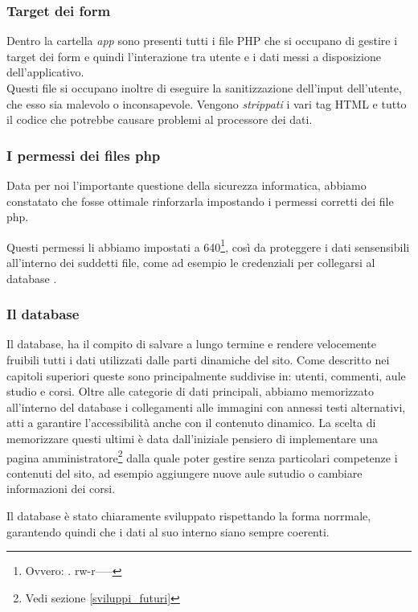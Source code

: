 \subsubsection{Target dei form}
Dentro la cartella \textit{app} sono presenti tutti i file PHP che si occupano di gestire i target dei form e quindi l'interazione tra utente e i dati messi a disposizione dell'applicativo.\\
Questi file si occupano inoltre di eseguire la sanitizzazione dell'input dell'utente, che esso sia malevolo o inconsapevole. Vengono \textit{strippati} i vari tag HTML e tutto il codice che potrebbe causare problemi al processore dei dati.

\subsubsection{I permessi dei files php}
Data per noi l'importante questione della sicurezza informatica, abbiamo constatato che fosse ottimale rinforzarla impostando i permessi corretti dei file php.

Questi permessi li abbiamo impostati a 640\footnote{Ovvero: . rw-r-----}, così da proteggere i dati sensensibili all'interno dei suddetti file, come ad esempio le credenziali per collegarsi al database .

\subsubsection{Il database}
Il database, ha il compito di salvare a lungo termine e rendere velocemente fruibili tutti i dati utilizzati  dalle parti dinamiche del sito. Come descritto nei capitoli superiori queste sono principalmente suddivise in: utenti, commenti, aule studio e corsi.
Oltre alle categorie di dati principali, abbiamo memorizzato all'interno del database i collegamenti alle immagini con annessi testi alternativi, atti a garantire l'accessibilità anche con il contenuto dinamico.
La scelta di memorizzare questi ultimi è data dall'iniziale pensiero di implementare una pagina amministratore\footnote{Vedi sezione \ref{sviluppi_futuri}} dalla quale poter gestire senza particolari competenze i contenuti del sito, ad esempio aggiungere nuove aule sutudio o cambiare informazioni dei corsi.

Il database è stato chiaramente sviluppato rispettando la forma norrmale, garantendo quindi che i dati al suo interno siano sempre coerenti.